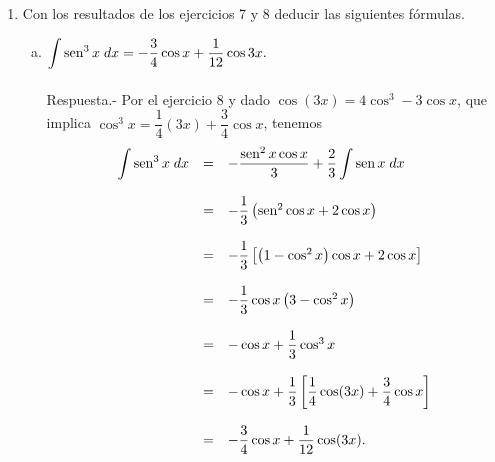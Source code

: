 \begin{enumerate}[\bfseries 1.]
\begin{enumerate}[(a)]
	    \end{enumerate}

    \item Con los resultados de los ejercicios 7 y 8 deducir las siguientes fórmulas.\\
	\begin{enumerate}[(a)]

	    \item $\displaystyle\int \mathop{\mbox{\normalfont sen}}\nolimits^3 x\; dx = -\dfrac{3}{4}\cos x + \dfrac{1}{12}\cos 3x.$\\\\
		Respuesta.-\; Por el ejercicio 8 y dado $\cos(3x)=4\cos^3-3\cos x$, que implica $\cos^3x=\dfrac{1}{4}(3x)+\dfrac{3}{4}\cos x$, tenemos
		$$
		\begin{array}{rcl}
		    \displaystyle\int \mathop{\mbox{\normalfont sen}}\nolimits^3 x\; dx &=& -\dfrac{\mathop{\mbox{\normalfont sen}}\nolimits^2x\cos x}{3}+\dfrac{2}{3}\displaystyle\int \mathop{\mbox{\normalfont sen}}\nolimits x\; dx\\\\
						    &=& -\dfrac{1}{3}\left(\mathop{\mbox{\normalfont sen}}\nolimits^2\cos x + 2\cos x\right)\\\\
						    &=& -\dfrac{1}{3}\left[\left(1-\cos^2 x\right)\cos x+2\cos x\right]\\\\
						    &=& - \dfrac{1}{3}\cos x\left(3-\cos^2 x\right)\\\\
						    &=&-\cos x + \dfrac{1}{3}\cos^3 x\\\\
						    &=&-\cos x + \dfrac{1}{3}\left[\dfrac{1}{4}\cos (3x)+\dfrac{3}{4}\cos x\right]\\\\
						    &=& -\dfrac{3}{4}\cos x + \dfrac{1}{12}\cos (3x).
		\end{array}
		$$
		\vspace{.5cm}


\end{enumerate}
\end{enumerate}
